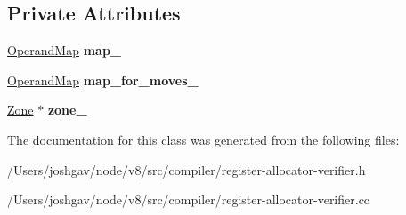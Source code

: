 \subsection*{Private Attributes}
\begin{DoxyCompactItemize}
\item 
\hyperlink{classv8_1_1internal_1_1_zone_map}{Operand\+Map} {\bfseries map\+\_\+}\hypertarget{classv8_1_1internal_1_1compiler_1_1_block_assessments_a1fff68bfc4301a4a17c0692a9d34cc73}{}\label{classv8_1_1internal_1_1compiler_1_1_block_assessments_a1fff68bfc4301a4a17c0692a9d34cc73}

\item 
\hyperlink{classv8_1_1internal_1_1_zone_map}{Operand\+Map} {\bfseries map\+\_\+for\+\_\+moves\+\_\+}\hypertarget{classv8_1_1internal_1_1compiler_1_1_block_assessments_a90936198810bfaf89985df4c1194b25d}{}\label{classv8_1_1internal_1_1compiler_1_1_block_assessments_a90936198810bfaf89985df4c1194b25d}

\item 
\hyperlink{classv8_1_1internal_1_1_zone}{Zone} $\ast$ {\bfseries zone\+\_\+}\hypertarget{classv8_1_1internal_1_1compiler_1_1_block_assessments_a5404dc61bbf91af21be4456e53b5d570}{}\label{classv8_1_1internal_1_1compiler_1_1_block_assessments_a5404dc61bbf91af21be4456e53b5d570}

\end{DoxyCompactItemize}


The documentation for this class was generated from the following files\+:\begin{DoxyCompactItemize}
\item 
/\+Users/joshgav/node/v8/src/compiler/register-\/allocator-\/verifier.\+h\item 
/\+Users/joshgav/node/v8/src/compiler/register-\/allocator-\/verifier.\+cc\end{DoxyCompactItemize}
